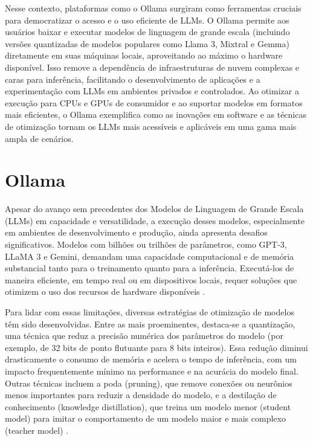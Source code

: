 Nesse contexto, plataformas como o Ollama surgiram como ferramentas cruciais para democratizar o acesso e o uso eficiente de LLMs. O Ollama permite aos usuários baixar e executar modelos de linguagem de grande escala (incluindo versões quantizadas de modelos populares como Llama 3, Mixtral e Gemma) diretamente em suas máquinas locais, aproveitando ao máximo o hardware disponível. Isso remove a dependência de infraestruturas de nuvem complexas e caras para inferência, facilitando o desenvolvimento de aplicações e a experimentação com LLMs em ambientes privados e controlados. Ao otimizar a execução para CPUs e GPUs de consumidor e ao suportar modelos em formatos mais eficientes, o Ollama exemplifica como as inovações em software e as técnicas de otimização tornam os LLMs mais acessíveis e aplicáveis em uma gama mais ampla de cenários.
\section{Ollama}

\label{sec:ollama}



Apesar do avanço sem precedentes dos Modelos de Linguagem de Grande Escala (LLMs) em capacidade e versatilidade, a execução desses modelos, especialmente em ambientes de desenvolvimento e produção, ainda apresenta desafios significativos. Modelos com bilhões ou trilhões de parâmetros, como GPT-3, LLaMA 3 e Gemini, demandam uma capacidade computacional e de memória substancial tanto para o treinamento quanto para a inferência. Executá-los de maneira eficiente, em tempo real ou em dispositivos locais, requer soluções que otimizem o uso dos recursos de hardware disponíveis \cite{ansar_survey_2024}.



Para lidar com essas limitações, diversas estratégias de otimização de modelos têm sido desenvolvidas. Entre as mais proeminentes, destaca-se a quantização, uma técnica que reduz a precisão numérica dos parâmetros do modelo (por exemplo, de 32 bits de ponto flutuante para 8 bits inteiros). Essa redução diminui drasticamente o consumo de memória e acelera o tempo de inferência, com um impacto frequentemente mínimo na performance e na acurácia do modelo final. Outras técnicas incluem a poda (pruning), que remove conexões ou neurônios menos importantes para reduzir a densidade do modelo, e a destilação de conhecimento (knowledge distillation), que treina um modelo menor (student model) para imitar o comportamento de um modelo maior e mais complexo (teacher model) \cite{lecun_deep_2015, goodfellow_deep_2016}.



